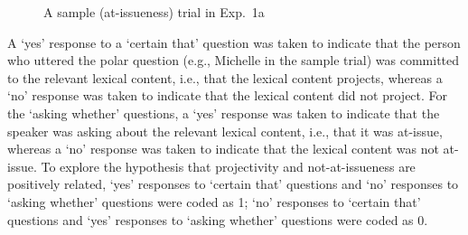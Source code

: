\documentclass[11pt,fleqn]{article}
\newcommand{\6}{\mbox{$[\hspace*{-.6mm}[$}}
\newcommand{\9}{\mbox{$]\hspace*{-.6mm}]$}}
\begin{document}
\begin{figure}[!h]
\begin{center}
\end{center}
\caption{A sample (at-issueness) trial in Exp.~1a}\label{f-trial-exp1}
\end{figure}

A `yes' response to a `certain that' question was taken to indicate that the person who uttered the polar question (e.g., Michelle in the sample trial) was committed to the relevant lexical content, i.e., that the lexical content projects, whereas a `no' response was taken to indicate that the lexical content did not project. For the `asking whether' questions, a `yes'  response was taken to indicate that the speaker was asking about the relevant lexical content, i.e., that it was at-issue, whereas a `no' response was taken to indicate that the lexical content was not at-issue. To explore the hypothesis that projectivity and not-at-issueness are positively related,  `yes' responses to `certain that' questions and `no' responses to `asking whether' questions were coded as 1; `no' responses to `certain that' questions and `yes' responses to `asking whether' questions were coded as 0.
\end{document}
